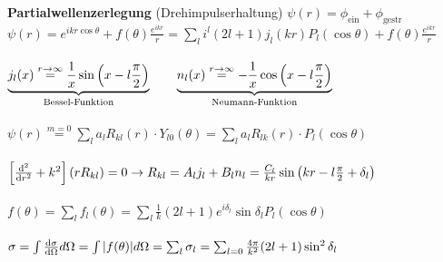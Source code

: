 




{\Huge
\textbf{Partialwellenzerlegung} (Drehimpulserhaltung) \(\psi(r) = \phi_{\text{ein}} + \phi_{\text{gestr}} \)\\
\(
  \boxed{\psi(r) = e^{ikr\cos\theta} + f(\theta)\frac{e^{i k r}}{r}} = \sum_{l}i^l(2l+1)j_l(kr)P_l(\cos\theta) + f(\theta)\frac{e^{i k r}}{r}
\)\\
\\
\(
  \underbr{j_l(x) \stackrel{r\to\infty}= \frac{1}{x}\sin\left(x - l\frac{\pi}{2}\right) }_{\text{Bessel-Funktion}} \quad  \quad
\underbr{n_l(x) \stackrel{r\to\infty}=  - \frac{1}{x}\cos\left(x - l\frac{\pi}{2}\right)}_{\text{Neumann-Funktion}} 
\)\\
\\
\(
   \psi(r) \stackrel{m=0}= \sum_l a_{l} R_{kl}(r)\cdot Y_{l0}(\theta) = \sum_l a_{l} R_{lk}(r)\cdot P_{l}(\cos\theta)
\)\\
\\
\(
  \left[ \diff^2_r + k^2 \right](rR_{kl}) = 0 \rightarrow R_{kl} = A_l j_l + B_l n_l= \frac{C_l}{kr}  \sin\left(kr-l\frac{\pi}{2} + \delta_l\right) 
\)\\
\\
\(
 \boxed{ f(\theta) = \sum_l f_l(\theta) = \sum_l \frac{1}{k} (2l+1)e^{i\delta_l}\sin\delta_l P_{l}(\cos\theta) }
\)\\
\\
\(
  \sigma = \int \diff{\sigma}_\Omega d\Omega = \int |f(\theta)| d\Omega  = \sum_l\sigma_l = \sum_{l=0}    \frac{4 \pi}{k^2} (2l+1)\sin^2\delta_l 
\)

}%

